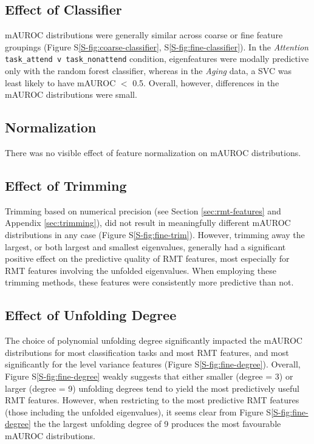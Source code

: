 \documentclass[12pt]{spieman}  %
\newcommand{\code}[1]{\small \texttt{#1} \normalsize}
\begin{document}
\begin{spacing}{2}
\subsection{Effect of Classifier}
mAUROC distributions were generally similar across coarse or fine feature
groupings (Figure S\ref{S-fig:coarse-classifier}, S\ref{S-fig:fine-classifier}).
In the \textit{Attention} \code{task\_attend v task\_nonattend} condition, eigenfeatures were modally predictive only with
the random forest classifier, whereas in the \textit{Aging} data, a SVC was least
likely to have mAUROC \(<\) 0.5. Overall, however, differences in the mAUROC distributions
were small.

\subsection{Normalization}
There was no visible effect of feature normalization on mAUROC distributions.


\subsection{Effect of Trimming}
Trimming based on numerical precision (see Section \ref{sec:rmt-features} and
Appendix \ref{sec:trimming}), did not result in meaningfully different mAUROC
distributions in any case (Figure S\ref{S-fig:fine-trim}). However, trimming
away the largest, or both largest and smallest eigenvalues, generally had a
significant positive effect on the predictive quality of RMT features, most
especially for RMT features involving the unfolded eigenvalues. When employing
these trimming methods, these features were consistently more predictive than
not.

\subsection{Effect of Unfolding Degree}
The choice of polynomial unfolding degree significantly impacted the mAUROC
distributions for most classification tasks and most RMT features, and most
significantly for the level variance features (Figure
S\ref{S-fig:fine-degree}). Overall, Figure S\ref{S-fig:fine-degree} weakly
suggests that either smaller (degree = 3) or larger (degree = 9) unfolding
degrees tend to yield the most predictively useful RMT features. However, when
restricting to the most predictive RMT features (those including the unfolded
eigenvalues), it seems clear from Figure S\ref{S-fig:fine-degree} the the
largest unfolding degree of 9 produces the most favourable mAUROC
distributions.


\end{spacing}
\end{document}
